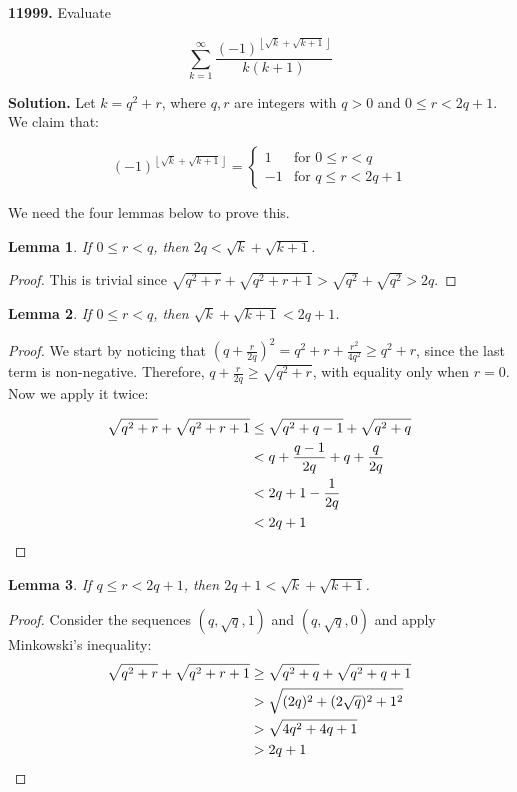 \documentclass{letter}
\begin{document}
\newtheorem{lemma}{Lemma}

\begin{letter}{}

\textbf{11999.} Evaluate

  $$\sum_{k=1}^{\infty}\frac{(-1)^{\left\lfloor\sqrt{k}+\sqrt{k+1}\right\rfloor}}{k(k+1)}$$

  \textbf{Solution.} Let $k=q^2+r$, where $q,r$ are integers with $q>0$ and $0\le r<2q+1$. We claim that:

  $$(-1)^{\left\lfloor\sqrt{k}+\sqrt{k+1}\right\rfloor} =
    \left.
    \begin{cases}
      1 & \text{for } 0\le r < q \\
      -1 & \text{for } q\le r < 2q+1
    \end{cases}
    \right. $$ 

We need the four lemmas below to prove this.

  \begin{lemma}
    If $0\le r<q$, then $2q < \sqrt{k}+\sqrt{k+1}$.
  \end{lemma}
  \begin{proof}
This is trivial since $\sqrt{q^2+r}+\sqrt{q^2+r+1} > \sqrt{q^2}+\sqrt{q^2}>2q$.
  \end{proof}

  \begin{lemma}
    If $0\le r <q$, then $\sqrt{k}+\sqrt{k+1}<2q+1$.
  \end{lemma}

  \begin{proof}
  We start by noticing that $\left(q+\frac{r}{2q}\right)^2=q^2+r+\frac{r^2}{4q^2}\ge q^2+r$, since the last term is non-negative. Therefore, $q+\frac{r}{2q}\ge\sqrt{q^2+r}$, with equality only when $r=0$. Now we apply it twice:

  \begin{align*}
    \sqrt{q^2+r}+\sqrt{q^2+r+1} 
    &\le \sqrt{q^2+q-1}+\sqrt{q^2+q} \\
    &< q+\frac{q-1}{2q}+q+\frac{q}{2q} \\
    &< 2q+1-\frac{1}{2q} \\
    &< 2q+1 \qedhere
  \end{align*}
  \end{proof}

  \begin{lemma}
    If $q\le r <2q+1$, then $2q+1<\sqrt{k}+\sqrt{k+1}$.
  \end{lemma}
  \begin{proof}
    Consider the sequences $(q,\sqrt{q},1)$ and $(q,\sqrt{q},0)$ and apply Minkowski's inequality:
    \begin{align*}
      \sqrt{q^2+r}+\sqrt{q^2+r+1}  
        &\ge \sqrt{q^2+q}+\sqrt{q^2+q+1}  \\
        &> \sqrt{(2q)^2+(2\sqrt{q})^2+1^2} \\
        &> \sqrt{4q^2+4q+1} \\
        &> 2q+1 \qedhere
    \end{align*}
  \end{proof}


\end{letter}
\end{document}
